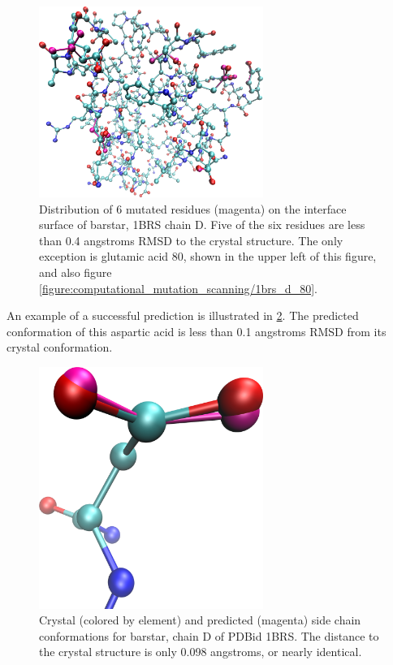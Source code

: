 \begin{figure}[h]
\centering
\includegraphics[width=0.65\textwidth,height=0.3\textheight,keepaspectratio]{figures/mutation_side_chain_images/1brs_all.png}
\caption{Distribution of 6 mutated residues (magenta) on the interface surface of barstar, 1BRS chain D.
Five of the six residues are less than 0.4 angstroms RMSD to the crystal structure.
The only exception is glutamic acid 80, shown in the upper left of this figure, and also figure \protect\ref{figure:computational_mutation_scanning/1brs_d_80}.}
\label{figure:computational_mutation_scanning/1brs_all}
\end{figure}

An example of a successful prediction is illustrated in \ref{figure:computational_mutation_scanning/1brs_d_35}.
The predicted conformation of this aspartic acid is less than 0.1 angstroms RMSD from its crystal conformation.
\begin{figure}[h]
    \centering
    \includegraphics[width=0.65\textwidth,height=0.3\textheight,keepaspectratio]{figures/mutation_side_chain_images/1brs_chain_d_35.png}
    \caption{Crystal (colored by element) and predicted (magenta) side chain conformations for barstar, chain D of PDBid 1BRS.
    The distance to the crystal structure is only 0.098 angstroms, or nearly identical.}
    \label{figure:computational_mutation_scanning/1brs_d_35}
\end{figure}

